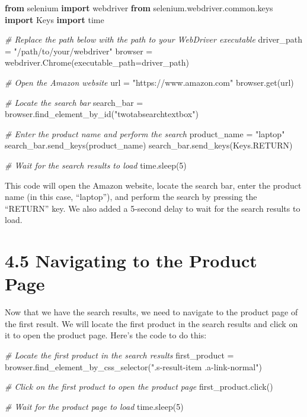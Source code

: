 \documentclass[
  paper=a4,
  ,captions=tableheading
]{scrartcl}
\newenvironment{Shaded}{}{}
\newcommand{\CommentTok}[1]{\textcolor[rgb]{0.38,0.63,0.69}{\textit{#1}}}
\newcommand{\DecValTok}[1]{\textcolor[rgb]{0.25,0.63,0.44}{#1}}
\newcommand{\ImportTok}[1]{\textcolor[rgb]{0.00,0.50,0.00}{\textbf{#1}}}
\newcommand{\NormalTok}[1]{#1}
\newcommand{\OperatorTok}[1]{\textcolor[rgb]{0.40,0.40,0.40}{#1}}
\newcommand{\StringTok}[1]{\textcolor[rgb]{0.25,0.44,0.63}{#1}}
\begin{document}
\begin{Shaded}
\begin{Highlighting}[]
\ImportTok{from}\NormalTok{ selenium }\ImportTok{import}\NormalTok{ webdriver}
\ImportTok{from}\NormalTok{ selenium.webdriver.common.keys }\ImportTok{import}\NormalTok{ Keys}
\ImportTok{import}\NormalTok{ time}

\CommentTok{\# Replace the path below with the path to your WebDriver executable}
\NormalTok{driver\_path }\OperatorTok{=} \StringTok{"/path/to/your/webdriver"}
\NormalTok{browser }\OperatorTok{=}\NormalTok{ webdriver.Chrome(executable\_path}\OperatorTok{=}\NormalTok{driver\_path)}

\CommentTok{\# Open the Amazon website}
\NormalTok{url }\OperatorTok{=} \StringTok{"https://www.amazon.com"}
\NormalTok{browser.get(url)}

\CommentTok{\# Locate the search bar}
\NormalTok{search\_bar }\OperatorTok{=}\NormalTok{ browser.find\_element\_by\_id(}\StringTok{"twotabsearchtextbox"}\NormalTok{)}

\CommentTok{\# Enter the product name and perform the search}
\NormalTok{product\_name }\OperatorTok{=} \StringTok{"laptop"}
\NormalTok{search\_bar.send\_keys(product\_name)}
\NormalTok{search\_bar.send\_keys(Keys.RETURN)}

\CommentTok{\# Wait for the search results to load}
\NormalTok{time.sleep(}\DecValTok{5}\NormalTok{)}
\end{Highlighting}
\end{Shaded}

This code will open the Amazon website, locate the search bar, enter the
product name (in this case, ``laptop''), and perform the search by
pressing the ``RETURN'' key. We also added a 5-second delay to wait for
the search results to load.

\hypertarget{navigating-to-the-product-page}{%
\section{4.5 Navigating to the Product
Page}\label{navigating-to-the-product-page}}

Now that we have the search results, we need to navigate to the product
page of the first result. We will locate the first product in the search
results and click on it to open the product page. Here's the code to do
this:

\begin{Shaded}
\begin{Highlighting}[]
\CommentTok{\# Locate the first product in the search results}
\NormalTok{first\_product }\OperatorTok{=}\NormalTok{ browser.find\_element\_by\_css\_selector(}\StringTok{".s{-}result{-}item .a{-}link{-}normal"}\NormalTok{)}

\CommentTok{\# Click on the first product to open the product page}
\NormalTok{first\_product.click()}

\CommentTok{\# Wait for the product page to load}
\NormalTok{time.sleep(}\DecValTok{5}\NormalTok{)}
\end{Highlighting}
\end{Shaded}
\end{document}
